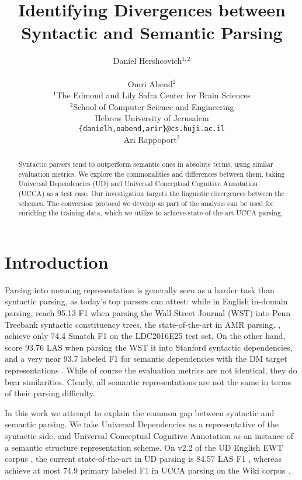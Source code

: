 \documentclass[11pt,a4paper]{article}
\title{Identifying Divergences between Syntactic and Semantic Parsing}
\author{Daniel Hershcovich$^{1,2}$ \\
  \\\And
  Omri Abend$^2$ \\
  $^1$The Edmond and Lily Safra Center for Brain Sciences \\
  $^2$School of Computer Science and Engineering \\
  Hebrew University of Jerusalem \\
  \texttt{\{danielh,oabend,arir\}@cs.huji.ac.il}
  \\\And
  Ari Rappoport$^2$
}
\date{}
\begin{document}
\maketitle

\begin{abstract}
Syntactic parsers tend to outperform semantic ones in absolute terms,
using similar evaluation metrics.
We explore the commonalities and differences between them,
taking Universal Dependencies (UD) and
Universal Conceptual Cognitive Annotation (UCCA)
as a test case.
Our investigation targets the linguistic divergences between the schemes.
The conversion protocol we develop as part of the analysis
can be used for enriching the training data,
which we utilize to achieve state-of-the-art UCCA parsing.
\end{abstract}

\section{Introduction}\label{sec:introduction}

Parsing into meaning representation is generally seen as a harder task than
syntactic parsing, as today's top parsers can attest:
while in English in-domain parsing,
\citet{P18-1249} reach 95.13 F1 when parsing the Wall-Street Journal (WST) into
Penn Treebank syntactic constituency trees,
the state-of-the-art in AMR parsing, \citet{lyu2018amr},
achieve only 74.4 Smatch F1 on the LDC2016E25 test set.
On the other hand, \citet{dozat2016deep,P18-2077}
score 93.76 LAS when parsing the WST it into Stanford syntactic dependencies,
and a very near 93.7 labeled F1 for semantic dependencies with the
DM target representations \cite{oepen2016towards}.
While of course the evaluation metrics are not identical,
they do bear similarities.
Clearly, all semantic representations are not the same in terms of their parsing difficulty.

In this work we attempt to explain the common gap between syntactic and semantic parsing.
We take Universal Dependencies \cite[UD; ][]{nivre2016universal} as a representative of the syntactic side,
and Universal Conceptual Cognitive Annotation \cite[UCCA; ][]{abend2013universal}
as an instance of a semantic structure representation scheme.
On v2.2 of the UD English EWT corpus \cite{11234/1-2837},
the current state-of-the-art in UD parsing is 84.57 LAS F1 \cite{che-EtAl:2018:K18-2},
whereas \citet{hershcovich2018multitask} achieve at most
74.9 primary labeled F1 in UCCA parsing on the Wiki corpus
\cite{hershcovich2017a}.
\end{document}
